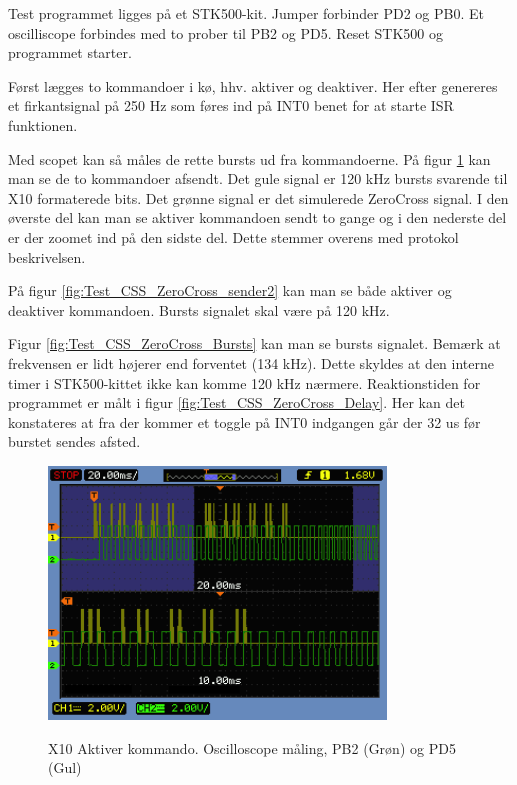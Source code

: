 Test programmet ligges på et STK500-kit.
Jumper forbinder PD2 og PB0. Et oscilliscope forbindes med to prober til PB2 og PD5.
Reset STK500 og programmet starter.

Først lægges to kommandoer i kø, hhv. aktiver og deaktiver. Her efter genereres et firkantsignal på 250 Hz som føres ind på INT0 benet for at starte ISR funktionen.

Med scopet kan så måles de rette bursts ud fra kommandoerne. På figur \ref{fig:Test_CSS_ZeroCross_sender1} kan man se de to kommandoer afsendt. Det gule signal er 120 kHz bursts svarende til X10 formaterede bits. Det grønne signal er det simulerede ZeroCross signal. I den øverste del kan man se aktiver kommandoen sendt to gange og i den nederste del er der zoomet ind på den sidste del. Dette stemmer overens med protokol beskrivelsen.

På figur \ref{fig:Test_CSS_ZeroCross_sender2} kan man se både aktiver og deaktiver kommandoen.
Bursts signalet skal være på 120 kHz. 

Figur \ref{fig:Test_CSS_ZeroCross_Bursts} kan man se bursts signalet. Bemærk at frekvensen er lidt højerer end forventet (134 kHz). Dette skyldes at den interne timer i STK500-kittet ikke kan komme 120 kHz nærmere.
Reaktionstiden for programmet er målt i figur \ref{fig:Test_CSS_ZeroCross_Delay}. Her kan det konstateres at fra der kommer et toggle på INT0 indgangen går der 32 us før burstet sendes afsted.

\begin{figure}[!htb]
	\centering
     {\includegraphics[width=0.8\textwidth]{billeder/SWTest/X10IF_Test_Afsend_1_kommando}}
     \caption{X10 Aktiver kommando. Oscilloscope måling, PB2 (Grøn) og PD5 (Gul)}
     \label{fig:Test_CSS_ZeroCross_sender1}
\end{figure}

